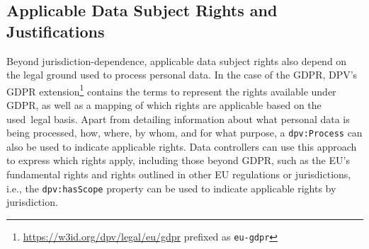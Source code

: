 \documentclass{IOS-Book-Article}     %
\begin{document}
\subsection{Applicable Data Subject Rights and Justifications}
\label{sec:applicable-rights}

Beyond jurisdiction-dependence, applicable data subject rights also depend on the legal ground used to process personal data.
In the case of the GDPR, DPV's GDPR extension\footnote{\url{https://w3id.org/dpv/legal/eu/gdpr} prefixed as \texttt{eu-gdpr}} contains the terms to represent the rights available under GDPR, as well as a mapping of which rights are applicable based on the used~legal basis.
Apart from detailing information about what personal data is being processed, how, where, by whom, and for what purpose, a \texttt{dpv:Process} can also be used to indicate applicable rights.
Data controllers can use this approach to express which rights apply, including those beyond GDPR, such as the EU’s fundamental rights and rights outlined in other EU regulations or jurisdictions, i.e., the \texttt{dpv:hasScope} property can be used to indicate applicable rights by jurisdiction.


\end{document}
